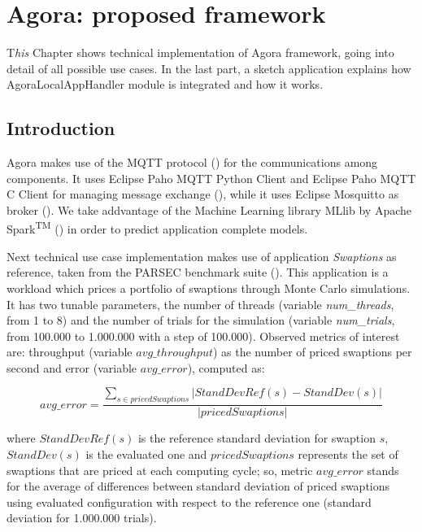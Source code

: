 \chapter{Agora: proposed framework}\label{agora}

\lettrine{T}{}\textit{his} Chapter shows technical implementation of Agora framework, going into detail of all possible use cases. In the last part, a sketch application explains how AgoraLocalAppHandler module is integrated and how it works.


\section{Introduction}

Agora makes use of the MQTT protocol (\cite{banks2014mqtt}) for the communications among components. It uses Eclipse Paho MQTT Python Client and Eclipse Paho MQTT C Client for managing message exchange (\cite{o2014paho}), while it uses Eclipse Mos\-quitto as broker (\cite{light2013mosquitto}). We take addvantage of the Machine Learning library MLlib by Apache Spark\textsuperscript{TM} (\cite{spark2015apache}) in order to predict application complete models.

Next technical use case implementation makes use of application \textit{Swaptions} as reference, taken from the PARSEC benchmark suite (\cite{bienia2008parsec}). This application is a workload which prices a portfolio of swaptions through Monte Carlo simulations. It has two tunable parameters, the number of threads (variable \textit{num\_threads}, from 1 to 8) and the number of trials for the simulation (variable \textit{num\_trials}, from 100.000 to 1.000.000 with a step of 100.000). Observed metrics of interest are: throughput (variable $avg\_throughput$) as the number of priced swaptions per second and error (variable $avg\_error$), computed as:

\[
avg\_error = \dfrac{\sum_{s \in pricedSwaptions} \left\vert StandDevRef(s) - StandDev(s) \right\vert}{\left\vert pricedSwaptions \right\vert}
\]

where $StandDevRef(s)$ is the reference standard deviation for swaption $s$, $StandDev(s)$ is the evaluated one and $pricedSwaptions$ represents the set of swaptions that are priced at each computing cycle; so, metric $avg\_error$ stands for the average of differences between standard deviation of priced swaptions using evaluated configuration with respect to the reference one (standard deviation for 1.000.000 trials).


